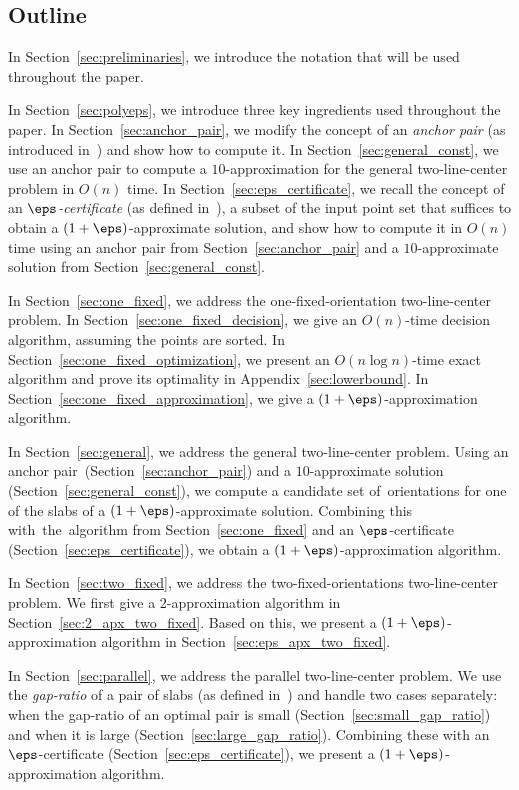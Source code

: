 \newpage
\subsection{Outline}
In Section~\ref{sec:preliminaries}, we introduce the notation that will be used throughout the paper.

In Section~\ref{sec:polyeps}, we introduce three key ingredients used throughout the paper.
In Section~\ref{sec:anchor_pair}, we modify the concept of an \emph{anchor pair} (as introduced in~\cite{agarwalTwo}) and show how to compute it.
In Section~\ref{sec:general_const}, we use an anchor pair to compute a $10$-approximation for the general two-line-center problem in $O(n)$ time.
In Section~\ref{sec:eps_certificate}, we recall the concept of an \emph{$\eps$-certificate} (as defined in~\cite{agarwal2005approximation}), a subset of the input point set that suffices to obtain a $(1+\eps)$-approximate solution, and show how to compute it in $O(n)$ time using an anchor pair from Section~\ref{sec:anchor_pair} and a $10$-approximate solution from Section~\ref{sec:general_const}.

In Section~\ref{sec:one_fixed}, we address the one-fixed-orientation two-line-center problem.
In Section~\ref{sec:one_fixed_decision}, we give an $O(n)$-time decision algorithm, assuming the points are sorted.
In Section~\ref{sec:one_fixed_optimization}, we present an $O(n\log n)$-time exact algorithm and prove its optimality in Appendix~\ref{sec:lowerbound}.
In Section~\ref{sec:one_fixed_approximation}, we give a $(1+\eps)$-approximation algorithm.

In Section~\ref{sec:general}, we address the general two-line-center problem.
Using an anchor pair~(Section~\ref{sec:anchor_pair}) and a $10$-approximate solution (Section~\ref{sec:general_const}), we compute a candidate set of~orientations for one of the slabs of a $(1+\eps)$-approximate solution.
Combining this with~the~algorithm from Section~\ref{sec:one_fixed} and an $\eps$-certificate (Section~\ref{sec:eps_certificate}), we obtain a $(1+\eps)$-approximation algorithm.

In Section~\ref{sec:two_fixed}, we address the two-fixed-orientations two-line-center problem.
We first give a $2$-approximation algorithm in Section~\ref{sec:2_apx_two_fixed}. 
Based on this, we present a $(1+\eps)$-approximation algorithm in Section~\ref{sec:eps_apx_two_fixed}.

In Section~\ref{sec:parallel}, we address the parallel two-line-center problem.
We use the \emph{gap-ratio} of a pair of slabs (as defined in~\cite{chung2025parallel}) and handle two cases separately: when the gap-ratio of an optimal pair is small (Section~\ref{sec:small_gap_ratio}) and when it is large (Section~\ref{sec:large_gap_ratio}).
Combining these with an $\eps$-certificate (Section~\ref{sec:eps_certificate}), we present a $(1+\eps)$-approximation algorithm.


